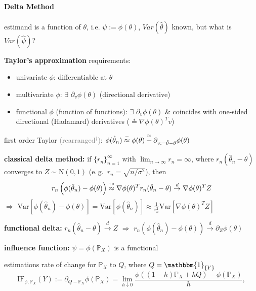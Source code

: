 \documentclass[8pt,twoside]{extarticle}
\begin{document}
\begin{multicols}{2}
\paragraph{Delta Method}  \citep{zepeda2022delta} estimand is a function of $\theta$, i.e. $\psi := \phi(\theta)$, $Var(\hat{\theta})$ known, but what is $Var(\hat{\psi})$?


 \textbf{Taylor's approximation} requirements:
\begin{itemize}[leftmargin=*, itemsep=0em, topsep=0pt, partopsep=0pt,parsep=0pt]
\item univariate $\phi$: differentiable at $\theta$
\item multivariate $\phi$: $\exists$ $\partial_v\phi(\theta)$ (directional derivative)
\item functional $\phi$ (function of functions): $\exists$ $\partial_v\phi(\theta)$ \& coincides with one-sided directional (Hadamard) derivatives ($\overset{*}{=}\nabla \phi(\theta)^Tv$)
\end{itemize}

 first order Taylor \textcolor{gray}{(rearranged$^\dagger$)}: $\phi(\hat{\theta}_n) \overset{\mathbin{\textcolor{gray}{-}}}{\approx} \phi(\theta) \overset{\mathbin{\textcolor{gray}{\approx}}}{+} \partial_{v:=\hat{\theta}-\theta}\phi(\theta)$

 \textbf{classical delta method:} if $\{r_n\}_{n=1}^\infty$ with $\lim_{n\to\infty} r_n=\infty$, where $r_n(\hat{\theta}_n -\theta)$ converges to $Z {\sim} \mathrm{N}(0,1)$ (e.\,g.\  $r_n{=}\sqrt{n/\sigma^2}$), then
$$r_n\left(\phi(\hat{\theta}_n) -\phi(\theta)\right) \overset{\mathbin{\textcolor{gray}{\dagger}}*}{\approx} \nabla \phi(\theta)^Tr_n(\hat{\theta}_n - \theta)    \overset{d}{\to} \nabla \phi(\theta)^TZ$$
$\Rightarrow$ $\mathrm{Var}\left[\phi(\hat{\theta}_n) {-}\phi(\theta)\right] = \mathrm{Var}\left[\phi(\hat{\theta}_n)\right]\approx \frac{1}{r^2_n} \mathrm{Var}\left[\nabla\phi(\theta)^TZ\right]$

 \textbf{functional delta:} $r_n(\hat{\theta}_n {-} \theta) \overset{d}{\to}Z$ $\Rightarrow$ 
$r_n\!\left(\phi(\hat{\theta}_n) {-} \phi(\theta)\right) \overset{d}{\to}\partial_Z\phi(\theta)$

 \textbf{influence function:} $\psi = \phi(\mathbb{P}_X)$ is a functional


 estimations rate of change for $\mathbb{P}_X$ to $Q$, where $Q=\mathbbm{1}_{\{Y\}}$
$$\mathrm{IF}_{\phi, \mathbb{P}_X}(Y) := \partial_{Q-\mathbb{P}_X}\phi(\mathbb{P}_X) =\lim_{h\downarrow 0}\frac{\phi\left((1-h)\mathbb{P}_X + hQ\right)-\phi(\mathbb{P}_X)}{h},$$




\end{multicols}
\end{document}
